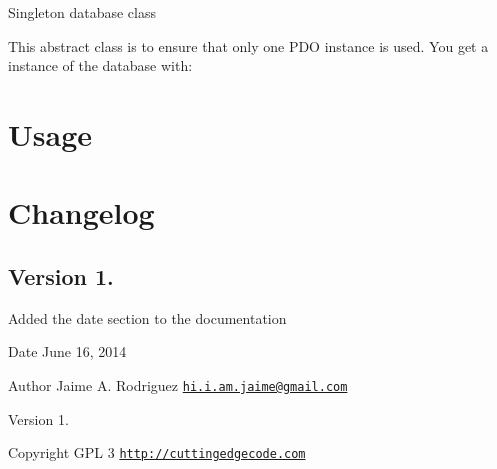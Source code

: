Singleton database class

This abstract class is to ensure that only one P\-D\-O instance is used. You get a instance of the database with\-:\hypertarget{nav1_usage}{}\section{Usage}\label{nav1_usage}

\hypertarget{nav1_changelog}{}\section{Changelog}\label{nav1_changelog}
\subsection*{Version 1.}


\begin{DoxyItemize}
\item Added the date section to the documentation
\end{DoxyItemize}

\begin{DoxyDate}{Date}
June 16, 2014 
\end{DoxyDate}
\begin{DoxyAuthor}{Author}
Jaime A. Rodriguez \href{mailto:hi.i.am.jaime@gmail.com}{\tt hi.\-i.\-am.\-jaime@gmail.\-com} 
\end{DoxyAuthor}
\begin{DoxyVersion}{Version}
1. 
\end{DoxyVersion}
\begin{DoxyCopyright}{Copyright}
G\-P\-L 3 \href{http://cuttingedgecode.com}{\tt http\-://cuttingedgecode.\-com} 
\end{DoxyCopyright}
